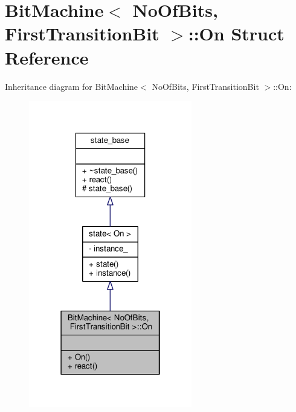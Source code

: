 \hypertarget{struct_bit_machine_1_1_on}{}\section{Bit\+Machine$<$ No\+Of\+Bits, First\+Transition\+Bit $>$\+:\+:On Struct Reference}
\label{struct_bit_machine_1_1_on}


Inheritance diagram for Bit\+Machine$<$ No\+Of\+Bits, First\+Transition\+Bit $>$\+:\+:On\+:
\nopagebreak
\begin{figure}[H]
\begin{center}
\leavevmode
\includegraphics[width=202pt]{struct_bit_machine_1_1_on__inherit__graph}
\end{center}
\end{figure}


